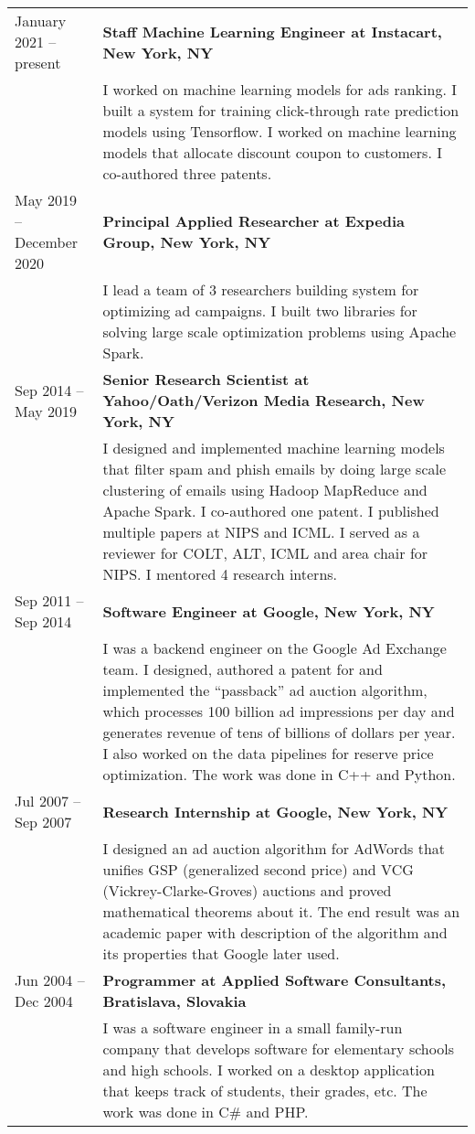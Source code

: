 \documentclass[9pt]{article}
\newcommand{\smallfont}{\small}
\begin{document}
\begin{longtable}{@{}lp{13cm}}
January 2021 -- present & \textbf{Staff Machine Learning Engineer at Instacart, New York, NY} \\
& {\smallfont I worked on
machine learning models for ads ranking. I built a system for training
click-through rate prediction models using Tensorflow. I worked on machine
learning models that allocate discount coupon to customers. I co-authored
three patents.}
\\[0.3cm]
May 2019 -- December 2020 & \textbf{Principal Applied Researcher at Expedia Group, New York, NY} \\
& {\smallfont I lead a team of 3 researchers building system for optimizing ad campaigns.
I built two libraries for solving large scale optimization problems using Apache Spark.}
\\[0.3cm]
Sep 2014 -- May 2019 & \textbf{Senior Research Scientist at Yahoo/Oath/Verizon Media Research, New York, NY} \\
& {\smallfont I designed and implemented machine learning models that filter
spam and phish emails by doing large scale clustering of emails using Hadoop
MapReduce and Apache Spark. I co-authored one patent. I published multiple
papers at NIPS and ICML. I served as a reviewer for COLT, ALT, ICML and area
chair for NIPS. I mentored 4 research interns.}
\\[0.3cm]
Sep 2011 -- Sep 2014 & \textbf{Software Engineer at Google, New York, NY} \\
& {\smallfont I was a backend engineer on the Google Ad Exchange team. I
designed, authored a patent for and implemented the ``passback'' ad auction
algorithm, which processes 100 billion ad impressions per day and generates
revenue of tens of billions of dollars per year. I also worked on the data
pipelines for reserve price optimization. The work was done in C++ and Python.}
\\[0.3cm]
Jul 2007 -- Sep 2007 & \textbf{Research Internship at Google, New York, NY} \\
& {\smallfont I designed an ad auction algorithm for AdWords that unifies GSP
(generalized second price) and VCG (Vickrey-Clarke-Groves) auctions and proved
mathematical theorems about it. The end result was an academic paper with description
of the algorithm and its properties that Google later used.}
\\[0.3cm]
Jun 2004 -- Dec 2004 & \textbf{Programmer at Applied Software Consultants, Bratislava, Slovakia} \\
& {\smallfont I was a software engineer in a small family-run company that
develops software for elementary schools and high schools. I worked on a desktop
application that keeps track of students, their grades, etc. The work was done in
C\# and PHP.}
\end{longtable}
\end{document}
